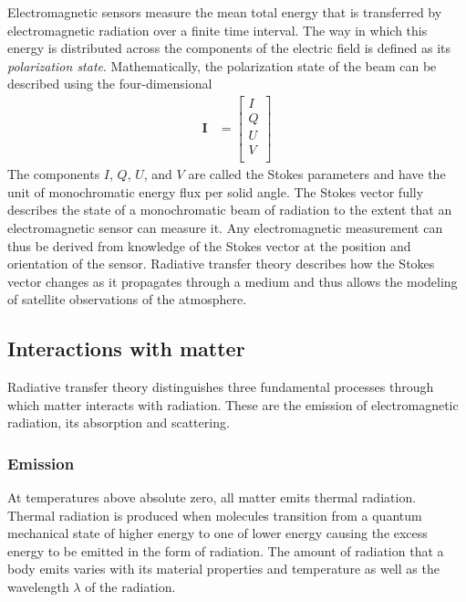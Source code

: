 Electromagnetic sensors measure the mean total energy that is transferred by
electromagnetic radiation over a finite time interval. The way in which this
energy is distributed across the components of the electric field is defined as
its \textit{polarization state}. Mathematically, the polarization state of the
beam can be described using the four-dimensional 
\begin{align}
  \bm{I} &= \left [ \begin{array}{c}
    I \\
    Q \\
    U \\
    V \\
    \end{array} \right ]
\end{align}
The components $I$, $Q$, $U$, and $V$ are called the Stokes parameters and have the
unit of monochromatic energy flux per solid angle. The Stokes vector fully
describes the state of a monochromatic beam of radiation to the extent that
 an electromagnetic sensor can measure it. Any electromagnetic
measurement can thus be derived from knowledge of the Stokes vector at the position
and orientation of the sensor. Radiative transfer theory describes how the
Stokes vector changes as it propagates through a medium and thus allows
the modeling of satellite observations of the atmosphere.

\subsection{Interactions with matter}

Radiative transfer theory distinguishes three fundamental processes through
which matter interacts with radiation. These are the emission of
electromagnetic radiation, its absorption and scattering.

\subsubsection{Emission}

At temperatures above absolute zero, all matter emits thermal radiation. Thermal
radiation is produced when molecules transition from a quantum mechanical state
of higher energy to one of lower energy causing the excess energy to be emitted
in the form of radiation. The amount of radiation that a body emits varies with
its material properties and temperature as well as the wavelength $\lambda$ of
the radiation.

